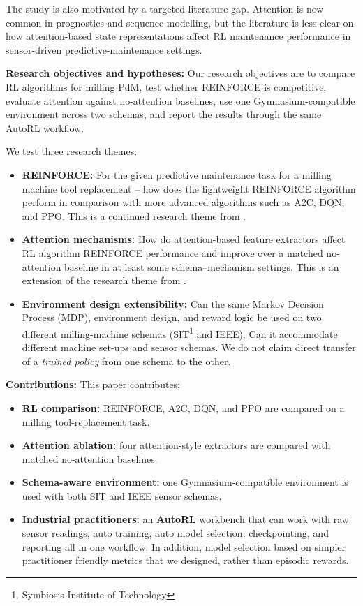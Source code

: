 \documentclass[sn-basic]{sn-jnl}%
\begin{document}
The study is also motivated by a targeted literature gap. Attention is now common in prognostics and sequence modelling, but the literature is less clear on how attention-based state representations affect RL maintenance performance in sensor-driven predictive-maintenance settings.

\textbf{Research objectives and hypotheses:}
Our research objectives are to compare RL algorithms for milling PdM, test whether \textsc{REINFORCE} is competitive, evaluate attention against no-attention baselines, use one Gymnasium-compatible environment across two schemas, and report the results through the same AutoRL workflow.

We test three research themes:
\begin{itemize}
    \item \textbf{REINFORCE:} For the given predictive maintenance task for a milling machine tool replacement -- how does the lightweight \textsc{REINFORCE} algorithm perform in comparison with more advanced algorithms such as \textsc{A2C}, \textsc{DQN}, and \textsc{PPO}. This is a continued research theme from \cite{Siraskar2025}.
	\item \textbf{Attention mechanisms:} How do attention-based feature extractors affect RL algorithm \textsc{REINFORCE} performance and improve over a matched no-attention baseline in at least some schema--mechanism settings. This is an extension of the research theme from \cite{Siraskar2024}.
	\item \textbf{Environment design extensibility:} Can the same Markov Decision Process (MDP), environment design, and reward logic be used on two different milling-machine schemas (SIT\footnote{Symbiosis Institute of Technology} and IEEE). Can it accommodate different machine set-ups and sensor schemas. We do not claim direct transfer of a \emph{trained policy} from one schema to the other.
\end{itemize}

\textbf{Contributions:}
This paper contributes:
\begin{itemize}
    \item \textbf{RL comparison:} \textsc{REINFORCE}, \textsc{A2C}, \textsc{DQN}, and \textsc{PPO} are compared on a milling tool-replacement task.
    \item \textbf{Attention ablation:} four attention-style extractors are compared with matched no-attention baselines.
    \item \textbf{Schema-aware environment:} one Gymnasium-compatible environment is used with both SIT and IEEE sensor schemas.
    \item \textbf{Industrial practitioners:} an \textbf{AutoRL} workbench that can work with raw sensor readings, auto training, auto model selection, checkpointing, and reporting all in one workflow. In addition, model selection based on simpler practitioner friendly metrics that we designed, rather than episodic rewards. 
\end{itemize}
\end{document}
